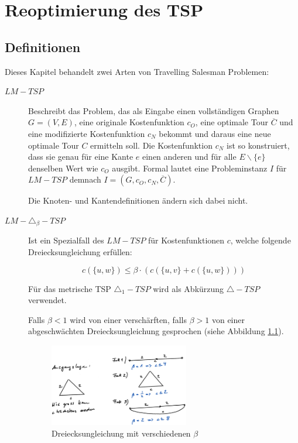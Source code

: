 \documentclass[a4paper,11pt]{scrreprt}
\begin{document}

\chapter{Reoptimierung des TSP}

\section{Definitionen}

Dieses Kapitel behandelt zwei Arten von Travelling Salesman Problemen:

\begin{description}
\item[$LM-TSP$] 
Beschreibt das Problem, das als Eingabe einen vollständigen Graphen $G = (V, E)$, eine originale Kostenfunktion $c_O$, eine optimale Tour $\overline{C}$ und eine modifizierte Kostenfunktion $c_N$ bekommt und daraus eine neue optimale Tour $C$ ermitteln soll. Die Kostenfunktion $c_N$ ist so konstruiert, dass sie genau für eine Kante $e$ einen anderen und für alle $E \backslash \{e\}$ denselben Wert wie $c_O$ ausgibt. Formal lautet eine Probleminstanz $I$ für $LM-TSP$ demnach $I = (G, c_O, c_N, \overline{C})$.
			    
Die Knoten- und Kantendefinitionen ändern sich dabei nicht.

\item[$LM-\triangle_\beta-TSP$]
Ist ein Spezialfall des $LM-TSP$ für Kostenfunktionen $c$, welche folgende Dreiecksungleichung erfüllen:

\[ c(\{u,w\}) \le \beta \cdot (c(\{u,v\} + c(\{u,w\}))) \]

Für das metrische TSP $\triangle_1-TSP$ wird als Abkürzung $\triangle-TSP$ verwendet.

Falls $\beta < 1$ wird von einer verschärften, falls $\beta > 1$ von einer abgeschwächten Dreiecksungleichung gesprochen (siehe Abbildung \ref{fig:triangle-inequality-beta}).

\begin{figure}[H]
\centering
\includegraphics[width=0.6\textwidth]{triangle_inequality_beta.png}
\caption{Dreiecksungleichung mit verschiedenen $\beta$}
\label{fig:triangle-inequality-beta}
\end{figure}


\end{description}
\end{document}
